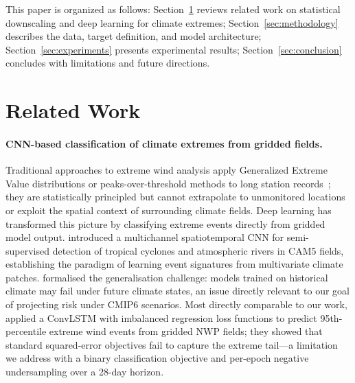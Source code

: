 \documentclass{article}
\begin{document}
This paper is organized as follows: Section~\ref{sec:rel_work} reviews related work on statistical downscaling and deep learning for climate extremes; Section~\ref{sec:methodology} describes the data, target definition, and model architecture; Section~\ref{sec:experiments} presents experimental results; Section~\ref{sec:conclusion} concludes with limitations and future directions.
\raggedbottom

\section{Related Work}
\label{sec:rel_work}

\paragraph{CNN-based classification of climate extremes from gridded fields.}
Traditional approaches to extreme wind analysis apply Generalized Extreme Value distributions or peaks-over-threshold methods to long station records~\cite{sillmannCMIP5extremes2013,outtenSobolowski2021}; they are statistically principled but cannot extrapolate to unmonitored locations or exploit the spatial context of surrounding climate fields. Deep learning has transformed this picture by classifying extreme events directly from gridded model output. \cite{racahExtremeWeather2017} introduced a multichannel spatiotemporal CNN for semi-supervised detection of tropical cyclones and atmospheric rivers in CAM5 fields, establishing the paradigm of learning event signatures from multivariate climate patches. \cite{molinaBenchmark2021} formalised the generalisation challenge: models trained on historical climate may fail under future climate states, an issue directly relevant to our goal of projecting risk under CMIP6 scenarios. Most directly comparable to our work, \cite{schulzLerch2023extremeWind} applied a ConvLSTM with imbalanced regression loss functions to predict 95th-percentile extreme wind events from gridded NWP fields; they showed that standard squared-error objectives fail to capture the extreme tail---a limitation we address with a binary classification objective and per-epoch negative undersampling over a 28-day horizon.
\end{document}
